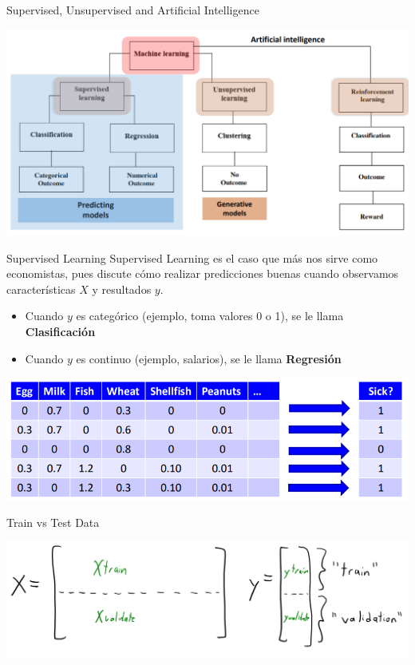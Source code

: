 \documentclass[11pt,handout,aspectratio=169]{beamer}
\begin{document}
\begin{frame}{Supervised, Unsupervised and Artificial Intelligence}
\begin{center}
\includegraphics[scale=0.5]{ai_ml.png}
\end{center}
\end{frame}

\begin{frame}{Supervised Learning}
Supervised Learning es el caso que más nos sirve como economistas, pues discute cómo realizar predicciones buenas cuando observamos características $X$ y resultados $y$.

\begin{itemize}
\item Cuando $y$ es categórico (ejemplo, toma valores 0 o 1), se le llama \textbf{Clasificación}
\vspace{0.4cm}

\item Cuando $y$ es continuo (ejemplo, salarios), se le llama \textbf{Regresión}
\end{itemize}

\begin{center}
\includegraphics[scale=0.5]{supervised_ml.png}
\end{center}

\end{frame}


\begin{frame}{Train vs Test Data}
\begin{center}
\includegraphics[scale=0.5]{train_test.png}
\end{center}

\end{frame}
\end{document}
